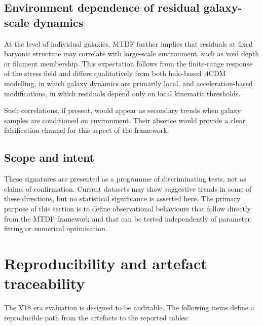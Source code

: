 \documentclass[11pt,a4paper]{article}
\begin{document}
\subsection{Environment dependence of residual galaxy-scale dynamics}
At the level of individual galaxies, MTDF further implies that residuals at fixed baryonic structure may correlate with large-scale environment, such as void depth or filament membership. This expectation follows from the finite-range response of the stress field and differs qualitatively from both halo-based $\Lambda$CDM modelling, in which galaxy dynamics are primarily local, and acceleration-based modifications, in which residuals depend only on local kinematic thresholds.

Such correlations, if present, would appear as secondary trends when galaxy samples are conditioned on environment. Their absence would provide a clear falsification channel for this aspect of the framework.

\subsection{Scope and intent}
These signatures are presented as a programme of discriminating tests, not as claims of confirmation. Current datasets may show suggestive trends in some of these directions, but no statistical significance is asserted here. The primary purpose of this section is to define observational behaviours that follow directly from the MTDF framework and that can be tested independently of parameter fitting or numerical optimisation.

\section{Reproducibility and artefact traceability}
\label{sec:sec11}
The V18 era evaluation is designed to be auditable. The following items define a reproducible path from the artefacts to the reported tables:
\end{document}
